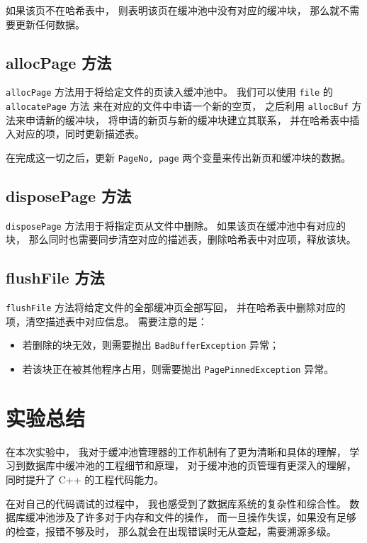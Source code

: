 \documentclass[12pt,onecolumn]{report}
\theoremstyle{plain}
\numberwithin{figure}{chapter}
\numberwithin{table}{chapter}
\numberwithin{lstlisting}{chapter}
\begin{document}
如果该页不在哈希表中，
则表明该页在缓冲池中没有对应的缓冲块，
那么就不需要更新任何数据。

\section{allocPage 方法}
\lstinline|allocPage| 方法用于将给定文件的页读入缓冲池中。
我们可以使用 \lstinline|file| 的 \lstinline|allocatePage| 方法
来在对应的文件中申请一个新的空页，
之后利用 \lstinline|allocBuf| 方法来申请新的缓冲块，
将申请的新页与新的缓冲块建立其联系，
并在哈希表中插入对应的项，同时更新描述表。

在完成这一切之后，更新 \lstinline|PageNo, page|
两个变量来传出新页和缓冲块的数据。

\section{disposePage 方法}
\lstinline|disposePage| 方法用于将指定页从文件中删除。
如果该页在缓冲池中有对应的块，
那么同时也需要同步清空对应的描述表，删除哈希表中对应项，释放该块。

\section{flushFile 方法}
\lstinline|flushFile| 方法将给定文件的全部缓冲页全部写回，
并在哈希表中删除对应的项，清空描述表中对应信息。
需要注意的是：
\begin{itemize}[fullwidth,itemindent=\parindent]
\item
  若删除的块无效，则需要抛出 \lstinline|BadBufferException| 异常；
\item
  若该块正在被其他程序占用，则需要抛出 \lstinline|PagePinnedException| 异常。
\end{itemize}

\chapter{实验总结}
在本次实验中，
我对于缓冲池管理器的工作机制有了更为清晰和具体的理解，
学习到数据库中缓冲池的工程细节和原理，
对于缓冲池的页管理有更深入的理解，
同时提升了 C++ 的工程代码能力。

在对自己的代码调试的过程中，
我也感受到了数据库系统的复杂性和综合性。
数据库缓冲池涉及了许多对于内存和文件的操作，
而一旦操作失误，如果没有足够的检查，报错不够及时，
那么就会在出现错误时无从查起，需要溯源多级。
\end{document}
